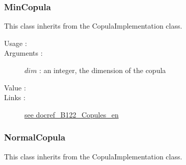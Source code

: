 \newpage \subsubsection{MinCopula}

This class inherits from the CopulaImplementation class.

\begin{description}

\item[Usage :] \rule{0pt}{1em}

\item[Arguments :]  $dim$       : an integer, the dimension of the copula

\item[Value :] \rule{0pt}{1em}

\item[Links :]
  \href{./Version/docref_B122_Copules_en.pdf}{see docref\_B122\_Copules\_en}
\end{description}


\newpage \subsubsection{NormalCopula}

This class inherits from the CopulaImplementation class.

